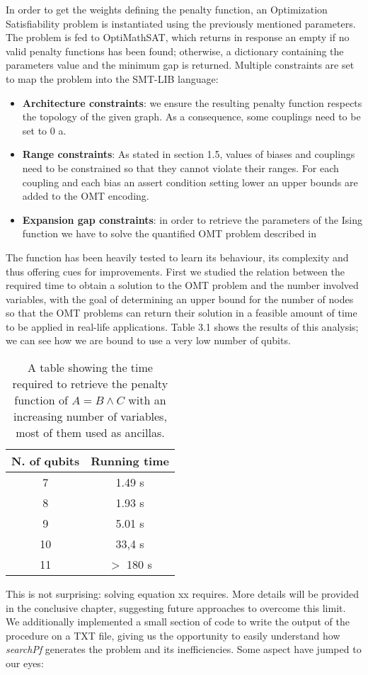 In order to get the weights defining the penalty function, an Optimization Satisfiability problem is instantiated using the previously mentioned parameters. The problem is fed to OptiMathSAT, which returns in response an empty if no valid penalty functions has been found; otherwise, a dictionary containing the parameters value and the minimum gap is returned. Multiple constraints are set to map the problem into the SMT-LIB language:
 
\begin{itemize}
    \item \textbf{Architecture constraints}: we ensure the resulting penalty function respects the topology of the given graph. As a consequence, some couplings need to be set to 0 a.
    \item \textbf{Range constraints}: As stated in section 1.5, values of biases and couplings need to be constrained so that they cannot violate their ranges. For each coupling and each bias an assert condition setting lower an upper bounds are added to the OMT encoding.
    \item \textbf{Expansion gap constraints}: in order to retrieve the parameters of the Ising function we have to solve the  quantified OMT problem described in 
\end{itemize}

The function has been heavily tested to learn its behaviour, its complexity and thus offering cues for improvements. First we studied the relation between the required time to obtain a solution to the OMT problem and the number involved variables, with the goal of determining an upper bound for the number of nodes so that the OMT problems can return their solution in a feasible amount of time to be applied in real-life applications. Table 3.1 shows the results of this analysis; we can see how we are bound to use a very low number of qubits.
\begin{table}[]
\centering
\begin{tabular}{|c|c|}
\hline
\rowcolor[HTML]{FFCC67} 
N. of qubits & Running time \\ \hline
7            & 1.49 s       \\ \hline
8            & 1.93 s       \\ \hline
9            & 5.01 s       \\ \hline
10           & 33,4 s       \\ \hline
11           & $>$ 180 s      \\ \hline
\end{tabular}
\caption{A table showing the time required to retrieve the penalty function of $A = B \wedge C$ with an increasing number of variables, most of them used as ancillas.}
\label{tab:my-table}
\end{table}
This is not surprising: solving equation xx requires. More details will be provided in the conclusive chapter, suggesting future approaches to overcome this limit. \\
We additionally implemented a small section of code to write the output of the procedure on a TXT file, giving us the opportunity to easily understand how \textit{searchPf} generates the problem and its inefficiencies. Some aspect have jumped to our eyes:

